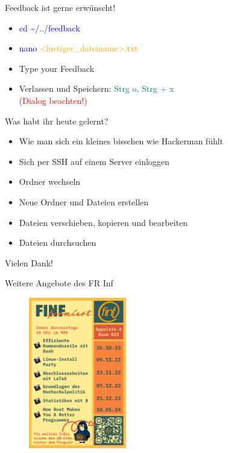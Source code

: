 \documentclass[t, xcolor=dvipsnames]{beamer}
\begin{document}
\begin{frame}{\huge{Feedback ist gerne erwünscht!}}
    \vspace{5mm}
    \normalsize
    \begin{itemize}
        \item \textcolor{blue}{cd \textasciitilde/../feedback}
        \item \textcolor{blue}{nano } \textcolor{orange}{<lustiger\_dateiname>.txt}
        \item Type your Feedback
        \item Verlassen und Speichern: \textcolor{teal}{Strg o, Strg + x}\\ \textcolor{red}{(Dialog beachten!)}
    \end{itemize}
    
\end{frame}

\begin{frame}{Was habt ihr heute gelernt?}
\begin{itemize}
    \item Wie man sich ein kleines bisschen wie Hackerman fühlt
    \item Sich per SSH auf einem Server einloggen
    \item Ordner wechseln
    \item Neue Ordner und Dateien erstellen
    \item Dateien verschieben, kopieren und bearbeiten
    \item Dateien durchsuchen
\end{itemize}

\vspace{15mm}
    \huge{Vielen Dank!}
    
\end{frame}

\begin{frame}{Weitere Angebote des FR Inf}
    \begin{figure}
        \centering
        \includegraphics[width=0.38\textwidth]{basicsofbash/graphics/finformiert Poster 2023 v8.png}
    \end{figure}
\end{frame}
\end{document}
